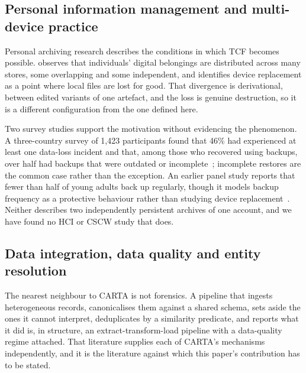 \subsection{Personal information management and multi-device practice}
\label{sec:related:pim}

Personal archiving research describes the conditions in which TCF becomes possible.
\citet{marshall2008archiving} observes that individuals' digital belongings are
distributed across many stores, some overlapping and some independent, and
identifies device replacement as a point where local files are lost for good. That
divergence is derivational, between edited variants of one artefact, and the loss
is genuine destruction, so it is a different configuration from the one defined
here.

Two survey studies support the motivation without evidencing the phenomenon. A
three-country survey of 1,423 participants found that 46\% had experienced at least
one data-loss incident and that, among those who recovered using backups, over half
had backups that were outdated or incomplete~\citep{wunder2025resilience};
incomplete restores are the common case rather than the exception. An earlier panel
study reports that fewer than half of young adults back up regularly, though it
models backup frequency as a protective behaviour rather than studying device
replacement~\citep{redmiles2019phone}. Neither describes two independently
persistent archives of one account, and we have found no HCI or CSCW study that
does.

\subsection{Data integration, data quality and entity resolution}
\label{sec:related:dataintegration}

The nearest neighbour to CARTA is not forensics. A pipeline that ingests
heterogeneous records, canonicalises them against a shared schema, sets aside the
ones it cannot interpret, deduplicates by a similarity predicate, and reports what
it did is, in structure, an extract-transform-load pipeline with a data-quality
regime attached. That literature supplies each of CARTA's mechanisms
independently, and it is the literature against which this paper's contribution
has to be stated.

